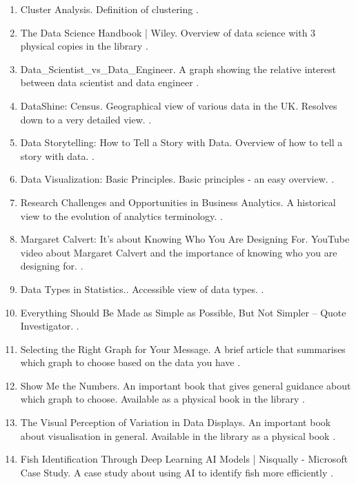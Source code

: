 \documentclass[a4paper]{article}
\begin{document}
\begin{enumerate}
\item Cluster Analysis. Definition of clustering \parencite{ClusterAnalysis2022}.
\item The Data Science Handbook | Wiley. Overview of data science with 3 physical copies in the library \parencite{DataScienceHandbook2017}.
\item Data\_Scientist\_vs\_Data\_Engineer. A graph showing the relative interest between data scientist and data engineer \parencite{DataScientistVs}.
\item DataShine: Census. Geographical view of various data in the UK. Resolves down to a very detailed view. \parencite{DataShineCensus2022}.
\item Data Storytelling: How to Tell a Story with Data. Overview of how to tell a story with data. \parencite{DataStorytellingHow2021}.
\item Data Visualization: Basic Principles. Basic principles - an easy overview. \parencite{DataVisualizationBasic2016}.
\item Research Challenges and Opportunities in Business Analytics. A historical view to the evolution of analytics terminology. \parencite{delenResearchChallengesOpportunities2018}.
\item Margaret Calvert: It's about Knowing Who You Are Designing For. YouTube video about Margaret Calvert and the importance of knowing who you are designing for. \parencite{designindabaMargaretCalvertIt2013}.
\item Data Types in Statistics.. Accessible view of data types. \parencite{dongesDataTypesStatistics2018}.
\item Everything Should Be Made as Simple as Possible, But Not Simpler – Quote Investigator.  \parencite{EverythingShouldBe}.
\item Selecting the Right Graph for Your Message. A brief article that summarises which graph to choose based on the data you have \parencite{fewSelectingRightGraph2004}.
\item Show Me the Numbers. An important book that gives general guidance about which graph to choose. Available as a physical book in the library \parencite{fewShowMeNumbers2012}.
\item The Visual Perception of Variation in Data Displays. An important book about visualisation in general. Available in the library as a physical book \parencite{fewVisualPerceptionVariation2016}.
\item Fish Identification Through Deep Learning AI Models | Nisqually - Microsoft Case Study. A case study about using AI to identify fish more efficiently \parencite{FishIdentificationDeep2021}.

\end{enumerate}
\end{document}
